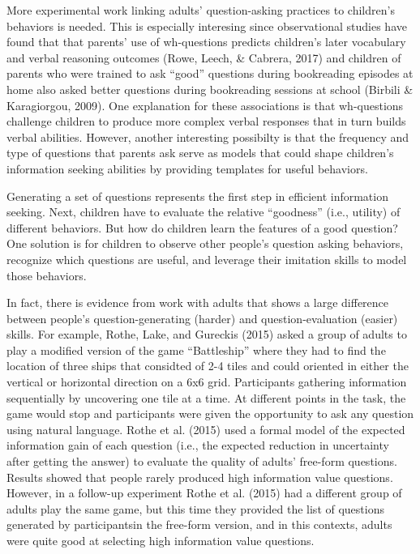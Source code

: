 \documentclass[english,floatsintext,man]{apa6}
\theoremstyle{definition}
\theoremstyle{definition}
\theoremstyle{definition}
\theoremstyle{remark}
\begin{document}
More experimental work linking adults' question-asking practices to
children's behaviors is needed. This is especially interesing since
observational studies have found that that parents' use of wh-questions
predicts children's later vocabulary and verbal reasoning outcomes
(Rowe, Leech, \& Cabrera, 2017) and children of parents who were trained
to ask \enquote{good} questions during bookreading episodes at home also
asked better questions during bookreading sessions at school (Birbili \&
Karagiorgou, 2009). One explanation for these associations is that
wh-questions challenge children to produce more complex verbal responses
that in turn builds verbal abilities. However, another interesting
possibilty is that the frequency and type of questions that parents ask
serve as models that could shape children's information seeking
abilities by providing templates for useful behaviors.

Generating a set of questions represents the first step in efficient
information seeking. Next, children have to evaluate the relative
\enquote{goodness} (i.e., utility) of different behaviors. But how do
children learn the features of a good question? One solution is for
children to observe other people's question asking behaviors, recognize
which questions are useful, and leverage their imitation skills to model
those behaviors.

In fact, there is evidence from work with adults that shows a large
difference between people's question-generating (harder) and
question-evaluation (easier) skills. For example, Rothe, Lake, and
Gureckis (2015) asked a group of adults to play a modified version of
the game \enquote{Battleship} where they had to find the location of
three ships that considted of 2-4 tiles and could oriented in either the
vertical or horizontal direction on a 6x6 grid. Participants gathering
information sequentially by uncovering one tile at a time. At different
points in the task, the game would stop and participants were given the
opportunity to ask any question using natural language. Rothe et al.
(2015) used a formal model of the expected information gain of each
question (i.e., the expected reduction in uncertainty after getting the
answer) to evaluate the quality of adults' free-form questions. Results
showed that people rarely produced high information value questions.
However, in a follow-up experiment Rothe et al. (2015) had a different
group of adults play the same game, but this time they provided the list
of questions generated by participantsin the free-form version, and in
this contexts, adults were quite good at selecting high information
value questions.
\end{document}
